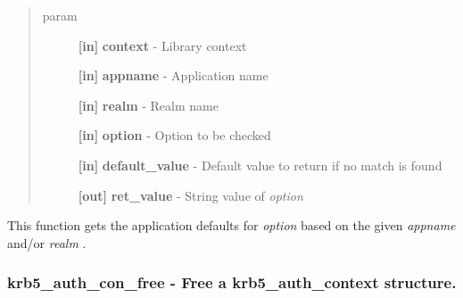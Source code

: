 \documentclass[letterpaper,10pt,english]{sphinxmanual}
\begin{document}
\begin{fulllineitems}
\label{appdev/refs/api/krb5_appdefault_string:c.krb5_appdefault_string}
\end{fulllineitems}

\begin{quote}\begin{description}
\item[{param}] \leavevmode
\textbf{{[}in{]}} \textbf{context} - Library context

\textbf{{[}in{]}} \textbf{appname} - Application name

\textbf{{[}in{]}} \textbf{realm} - Realm name

\textbf{{[}in{]}} \textbf{option} - Option to be checked

\textbf{{[}in{]}} \textbf{default\_value} - Default value to return if no match is found

\textbf{{[}out{]}} \textbf{ret\_value} - String value of \emph{option}

\end{description}\end{quote}

This function gets the application defaults for \emph{option} based on the given \emph{appname} and/or \emph{realm} .




{\hyperref[appdev/refs/api/krb5_appdefault_boolean:c.krb5_appdefault_boolean]{}}




\subsubsection{krb5\_auth\_con\_free -  Free a krb5\_auth\_context structure.}
\label{appdev/refs/api/krb5_auth_con_free:krb5-auth-con-free-free-a-krb5-auth-context-structure}\label{appdev/refs/api/krb5_auth_con_free::doc}

\begin{fulllineitems}
\label{appdev/refs/api/krb5_auth_con_free:c.krb5_auth_con_free}
\end{fulllineitems}
\end{document}
